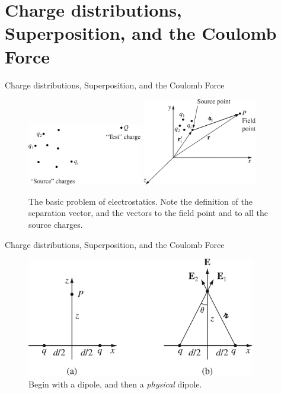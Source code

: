 \documentclass{beamer}
\begin{document}
\section{Charge distributions, Superposition, and the Coulomb Force}

\begin{frame}{Charge distributions, Superposition, and the Coulomb Force}
\begin{figure}
\centering
\includegraphics[width=5cm]{figures/2_1.jpg}
\includegraphics[width=5cm]{figures/2_3.jpg}
\caption{\label{fig:2_1} The basic problem of electrostatics. Note the definition of the separation vector, and the vectors to the field point and to all the source charges.}
\end{figure}
\end{frame}

\begin{frame}{Charge distributions, Superposition, and the Coulomb Force}
\begin{figure}
\centering
\includegraphics[width=10cm]{figures/2_4.jpg}
\caption{\label{fig:2_4} Begin with a dipole, and then a \textit{physical} dipole.}
\end{figure}
\end{frame}
\end{document}
